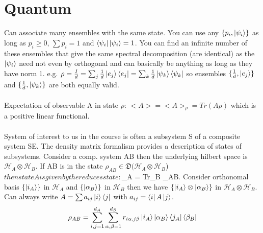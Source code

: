 \documentclass{article}
\begin{document}
\section{Quantum}
Can associate many ensembles with the same state. You can use any $\{p_i, \ket{\psi_i}\}$ as long as $p_i \geq 0$, $\sum p_i = 1$ and $\bra{\psi_i}\ket{\psi_i} = 1$. You can find an infinite number of these ensembles that give the same spectral decomposition (are identical) as the $\ket{\psi_i}$ need not even by orthogonal and can basically be anything as long as they have norm 1. e.g. $\rho = \frac{I}{d} = \sum_j \frac{1}{d} \ket{e_j}\bra{e_j} = \sum_k \frac{1}{d} \ket{\psi_k}\bra{\psi_k}$ so ensembles $\{\frac{1}{d}, \ket{e_j}\}$ and $\{\frac{1}{d}, \ket{\psi_k}\}$ are both equally valid.\\\\
Expectation of observable A in state $\rho$: $<A> = <A>_{\rho} = Tr(A\rho)$ which is a positive linear functional.\\\\
System of interest to us in the course is often a subsystem S of a composite system SE. The density matrix formalism provides a description of states of subsystems. Consider a comp. system AB then the underlying hilbert space is $\mathcal{H}_A \otimes \mathcal{H}_B$. If AB is in the state $\rho_{AB} \in \mathfrak{D}(\mathcal{H}_A \otimes \mathcal{H}_B$)$ then state A is given by the reduces state: $\rho_A = Tr_B \rho_{AB}. Consider orthonomal basis $\{ \ket{i_A} \}$ in $\mathcal{H}_A$ and $\{ \ket{\alpha_B} \}$ in $\mathcal{H}_B$ then we have $\{ \ket{i_A} \otimes \ket{\alpha_B} \}$ in $\mathcal{H}_A \otimes \mathcal{H}_B$. Can always write $A = \sum a_{ij} \ket{i}\bra{j}$ with $a_{ij} = \bra{i}A\ket{j}$.
$$
\rho_{AB} =\sum_{i,j =1}^{d_A} \sum_{\alpha,\beta=1}^{d_B} r_{i\alpha, j\beta}\ket{i_A}\ket{\alpha_B}\bra{j_A}\bra{\beta_B}
$$
\end{document}
